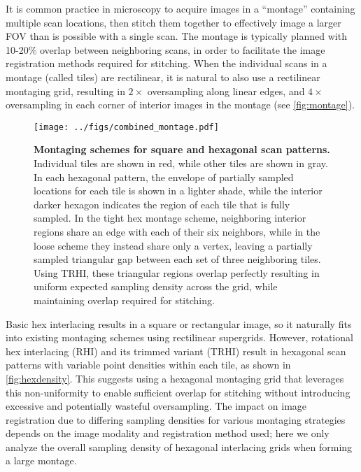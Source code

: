 \documentclass[aip, amsmath, amssymb, nobibnotes, nofootinbib, citeautoscript, reprint, superscriptaddress]{revtex4-1}
\begin{document}
    It is common practice in microscopy to acquire images in a ``montage'' containing multiple scan locations, then stitch them together to
    effectively image a larger FOV than is possible with a single scan.
    The montage is typically planned with 10-20\% overlap between neighboring scans, in order to facilitate the image registration methods required for stitching.
    When the individual scans in a montage (called tiles) are rectilinear, it is natural to also use a rectilinear montaging grid, resulting in $\mathrm{2\times}$ oversampling along linear edges, and $\mathrm{4\times}$ oversampling in each corner of interior images in the montage (see \autoref{fig:montage}).

    \begin{figure*}
        \centering
        \texttt{[image: ../figs/combined\_montage.pdf]}
        \caption{
            \label{fig:montage}\textbf{Montaging schemes for square and hexagonal scan patterns.}
            Individual tiles are shown in red, while other tiles are shown in gray.
            In each hexagonal pattern, the envelope of partially sampled locations for each tile is shown in a lighter shade, while the interior darker hexagon indicates the region of each tile that is fully sampled.
            In the tight hex montage scheme, neighboring interior regions share an edge with each of their six neighbors, while in the loose scheme they instead share only a vertex, leaving a partially sampled triangular gap between each set of three neighboring tiles.
            Using TRHI, these triangular regions overlap perfectly resulting in uniform expected sampling density across the grid, while maintaining overlap required for stitching.
            }
    \end{figure*}

    Basic hex interlacing results in a square or rectangular image, so it naturally fits into existing montaging schemes using rectilinear supergrids.
    However, rotational hex interlacing (RHI) and its trimmed variant (TRHI) result in hexagonal scan patterns with variable point densities within each tile, as shown in \autoref{fig:hexdensity}.
    This suggests using a hexagonal montaging grid that leverages this non-uniformity to enable sufficient overlap for stitching without introducing excessive and potentially wasteful oversampling.
    The impact on image registration due to differing sampling densities for various montaging strategies depends on the image modality and registration method used; here we only analyze the overall sampling density of hexagonal interlacing grids when forming a large montage.
\end{document}
